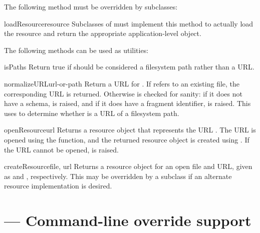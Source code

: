 \documentclass{howto}
\begin{document}
The following method must be overridden by subclasses:

\begin{methoddesc}[loader]{loadResource}{resource}
  Subclasses of  must implement this method to
  actually load the resource and return the appropriate
  application-level object.
\end{methoddesc}

The following methods can be used as utilities:

\begin{methoddesc}[loader]{isPath}{s}
  Return true if  should be considered a filesystem path rather
  than a URL.
\end{methoddesc}

\begin{methoddesc}[loader]{normalizeURL}{url-or-path}
  Return a URL for .  If  refers to
  an existing file, the corresponding  URL is returned.
  Otherwise  is checked for sanity: if it
  does not have a schema,  is raised, and if it
  does have a fragment identifier,  is
  raised.
  This uses  to determine whether 
  is a URL of a filesystem path.
\end{methoddesc}

\begin{methoddesc}[loader]{openResource}{url}
  Returns a resource object that represents the URL .  The
  URL is opened using the  function, and
  the returned resource object is created using
  .  If the URL cannot be opened,
   is raised.
\end{methoddesc}

\begin{methoddesc}[loader]{createResource}{file, url}
  Returns a resource object for an open file and URL, given as
   and , respectively.  This may be overridden by a
  subclass if an alternate resource implementation is desired.
\end{methoddesc}


\section{ --- Command-line override support}

\end{document}
